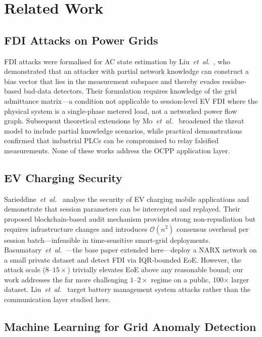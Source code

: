 \documentclass[journal]{IEEEtran}
\begin{document}
\section{Related Work}
\label{sec:related}

\subsection{FDI Attacks on Power Grids}

FDI attacks were formalised for AC state estimation by
Liu~\emph{et~al.}~\cite{liu2011false}, who demonstrated that
an attacker with partial network knowledge can construct a bias
vector that lies in the measurement subspace and thereby evades
residue-based bad-data detectors.
Their formulation requires knowledge of the grid admittance
matrix---a condition not applicable to session-level EV FDI
where the physical system is a single-phase metered load, not a
networked power flow graph.
Subsequent theoretical extensions by
Mo~\emph{et~al.}~\cite{liang2017review} broadened the threat model
to include partial knowledge scenarios, while practical
demonstrations confirmed that industrial PLCs can be compromised
to relay falsified measurements.
None of these works address the OCPP application layer.

\subsection{EV Charging Security}

Sarieddine~\emph{et~al.}~\cite{sarieddine2023} analyse the
security of EV charging mobile applications and demonstrate that
session parameters can be intercepted and replayed.
Their proposed blockchain-based audit mechanism provides strong
non-repudiation but requires infrastructure changes and introduces
$\mathcal{O}(n^2)$ consensus overhead per session batch---infeasible
in time-sensitive smart-grid deployments.
Basumatary~\emph{et~al.}~\cite{basumatary2025}---the base paper
extended here---deploy a NARX network on a small private dataset
and detect FDI via IQR-bounded EoE.
However, the attack scale ($8$--$15\times$) trivially elevates EoE
above any reasonable bound; our work addresses the far more
challenging $1$--$2\times$ regime on a public, 100$\times$ larger
dataset.
Liu~\emph{et~al.}~\cite{liu2021ev} target battery management
system attacks rather than the communication layer studied here.

\subsection{Machine Learning for Grid Anomaly Detection}
\end{document}
